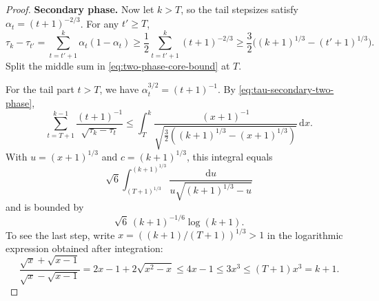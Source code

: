 \documentclass{article}
\begin{document}
\begin{proof}
\textbf{Secondary phase.}
Now let $k>T$, so the tail stepsizes satisfy $\alpha_t=(t+1)^{-2/3}$. For any $t'\ge T$,
\begin{equation}\label{eq:tau-secondary-two-phase}
\tau_k-\tau_{t'}=\sum_{t=t'+1}^k\alpha_t(1-\alpha_t) \ge \frac12\sum_{t=t'+1}^k(t+1)^{-2/3}\ge \frac32\bigl((k+1)^{1/3}-(t'+1)^{1/3}\bigr).
\end{equation}
Split the middle sum in \eqref{eq:two-phase-core-bound} at $T$.

For the tail part $t>T$, we have $\alpha_t^{3/2}=(t+1)^{-1}$. By \eqref{eq:tau-secondary-two-phase},
\begin{equation}
\sum_{t=T+1}^{k-1}\frac{(t+1)^{-1}}{\sqrt{\tau_k-\tau_t}} \le \int_T^k\frac{(x+1)^{-1}}{\sqrt{\frac32((k+1)^{1/3}-(x+1)^{1/3})}}\,\mathrm dx.
\end{equation}
With $u=(x+1)^{1/3}$ and $c=(k+1)^{1/3}$, this integral equals
\begin{equation}
\sqrt6\int_{(T+1)^{1/3}}^{(k+1)^{1/3}}\frac{\mathrm d u}{u\sqrt{(k+1)^{1/3}-u}}
\end{equation}
and is bounded by
\begin{equation}\label{eq:tail-log-two-phase}
\sqrt6\,(k+1)^{-1/6}\log(k+1).
\end{equation}
To see the last step, write $x=((k+1)/(T+1))^{1/3}>1$ in the logarithmic expression obtained after integration:
\begin{equation}
\frac{\sqrt{x}+\sqrt{x-1}}{\sqrt{x}-\sqrt{x-1}} =2x-1+2\sqrt{x^2-x} \le 4x-1\le 3x^3\le (T+1)x^3=k+1.
\end{equation}


\end{proof}
\end{document}
